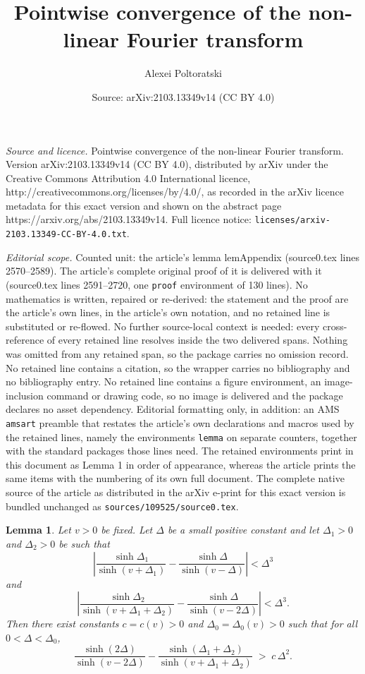 \documentclass[10pt,a4paper]{amsart}
\title{Pointwise convergence of the non-linear Fourier transform}
\author{Alexei Poltoratski}
\date{Source: arXiv:2103.13349v14 (CC BY 4.0)}
\newtheorem{lemma}{Lemma}
\begin{document}
\maketitle

\noindent\emph{Source and licence.} Pointwise convergence of the non-linear Fourier transform. Version arXiv:2103.13349v14 (CC BY 4.0), distributed by arXiv under the Creative Commons Attribution 4.0 International licence, http://creativecommons.org/licenses/by/4.0/, as recorded in the arXiv licence metadata for this exact version and shown on the abstract page https://arxiv.org/abs/2103.13349v14. Full licence notice: \texttt{licenses/arxiv-2103.13349-CC-BY-4.0.txt}.\par\smallskip

\noindent\textit{Editorial scope.} Counted unit: the article's lemma lemAppendix (source0.tex lines 2570--2589). The article's complete original proof of it is delivered with it (source0.tex lines 2591--2720, one \texttt{proof} environment of 130 lines). No mathematics is written, repaired or re-derived: the statement and the proof are the article's own lines, in the article's own notation, and no retained line is substituted or re-flowed.  No further source-local context is needed: every cross-reference of every retained line resolves inside the two delivered spans.  Nothing was omitted from any retained span, so the package carries no omission record.  No retained line contains a citation, so the wrapper carries no bibliography and no bibliography entry.  No retained line contains a figure environment, an image-inclusion command or drawing code, so no image is delivered and the package declares no asset dependency.  Editorial formatting only, in addition: an AMS \texttt{amsart} preamble that restates the article's own declarations and macros used by the retained lines, namely the environments \texttt{lemma} on separate counters, together with the standard packages those lines need.  The retained environments print in this document as Lemma 1 in order of appearance, whereas the article prints the same items with the numbering of its own full document.  The complete native source of the article as distributed in the arXiv e-print for this exact version is bundled unchanged as \texttt{sources/109525/source0.tex}.
\begin{lemma}\label{lemAppendix}
	Let $v>0$ be fixed. Let $\Delta$ be  a small positive constant and let 
	$\Delta_1>0$ and $\Delta_2>0$ be such that
	\[
	\left|\frac{\sinh \Delta_1}{\sinh(v+\Delta_1)}
	-\frac{\sinh \Delta}{\sinh(v-\Delta)}\right| <\Delta^3
	\]and \[
	\left|\frac{\sinh \Delta_2}{\sinh(v+\Delta_1+\Delta_2)}
	-\frac{\sinh \Delta}{\sinh(v-2\Delta)}\right| <\Delta^3.
	\]
	Then there exist constants $c=c(v)>0$ and $\Delta_0=\Delta_0(v)>0$ such that
	for all $0<\Delta<\Delta_0$,
	\[
	\frac{\sinh(2\Delta)}{\sinh(v-2\Delta)}
	-
	\frac{\sinh(\Delta_1+\Delta_2)}{\sinh(v+\Delta_1+\Delta_2)}
	\;>\;
	c\,\Delta^2 .
	\]
\end{lemma}
\end{document}
